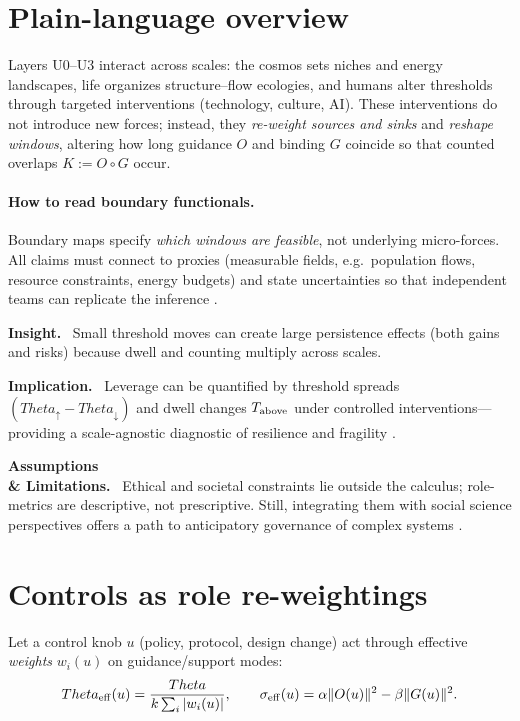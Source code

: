 \documentclass[12pt,a4paper,oneside]{scrreprt}
\def\Theta{Theta}%
\newenvironment{insight}{\par\vspace{0.5em}\noindent\textbf{Insight.}\ }{\par\vspace{0.5em}}
\newenvironment{implication}{\par\vspace{0.5em}\noindent\textbf{Implication.}\ }{\par\vspace{0.5em}}
\newenvironment{limitation}{\par\vspace{0.5em}\noindent\textbf{Assumptions \\ \& Limitations.}\ }{\par\vspace{0.5em}}
\begin{document}
\section*{Plain-language overview}
Layers U0–U3 interact across scales: the cosmos sets niches and energy landscapes, life organizes structure–flow ecologies, and humans alter thresholds through targeted interventions (technology, culture, AI). 
These interventions do not introduce new forces; instead, they \emph{re-weight sources and sinks} and \emph{reshape windows}, altering how long guidance $O$ and binding $G$ coincide so that counted overlaps $K:=O\!\circ G$ occur.

\paragraph{How to read boundary functionals.}
Boundary maps specify \emph{which windows are feasible}, not underlying micro-forces. 
All claims must connect to proxies (measurable fields, e.g.\ population flows, resource constraints, energy budgets) and state uncertainties so that independent teams can replicate the inference \cite{Holling1973,Levin1998}.

\begin{insight}
Small threshold moves can create large persistence effects (both gains and risks) because dwell and counting multiply across scales.
\end{insight}

\begin{implication}
Leverage can be quantified by threshold spreads $(\Theta_\uparrow-\Theta_\downarrow)$ and dwell changes $T_{\rm above}$ under controlled interventions—providing a scale-agnostic diagnostic of resilience and fragility \cite{Scheffer2001,Walker2004}.
\end{implication}

\begin{limitation}
Ethical and societal constraints lie outside the calculus; role-metrics are descriptive, not prescriptive. 
Still, integrating them with social science perspectives offers a path to anticipatory governance of complex systems \cite{Ostrom2009,Rockstrom2009}.
\end{limitation}

\section{Controls as role re-weightings}\label{sec:controls-mapping}
Let a control knob $u$ (policy, protocol, design change) act through effective \emph{weights} $w_i(u)$ on guidance/support modes:
\[
\Theta_{\rm eff}(u)=\frac{\Theta}{k\sum_i |w_i(u)|},\qquad 
\sigma_{\rm eff}(u)=\alpha\|O(u)\|^2-\beta\|G(u)\|^2.
\]
\end{document}
